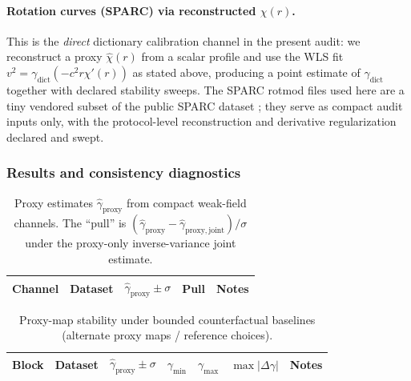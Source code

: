 \paragraph{Rotation curves (SPARC) via reconstructed \texorpdfstring{$\chi(r)$}{chi(r)}.}
\InterfaceTag This is the \emph{direct} dictionary calibration channel in the present audit: we reconstruct a proxy $\widehat\chi(r)$ from a scalar profile and use the WLS
fit $v^2=\gamma_{\mathrm{dict}}(-c^2 r\chi'(r))$ as stated above, producing a point estimate of $\gamma_{\mathrm{dict}}$ together with declared stability sweeps.
\MatchTag The SPARC rotmod files used here are a tiny vendored subset of the public SPARC dataset \cite{LelliMcGaughSchombert2016SPARC}; they serve as compact
audit inputs only, with the protocol-level reconstruction and derivative regularization declared and swept.

\subsubsection{Results and consistency diagnostics}
\label{subsec:gamma_crossobs_results}

\begin{table}[t]
\centering
\caption{Proxy estimates $\widehat\gamma_{\mathrm{proxy}}$ from compact weak-field channels. The ``pull'' is $(\widehat\gamma_{\mathrm{proxy}}-\widehat\gamma_{\mathrm{proxy,joint}})/\sigma$ under the proxy-only inverse-variance joint estimate.}
\label{tab:gamma_proxy_estimates}
\begin{tabular}{llllp{7.2cm}}
\toprule
Channel & Dataset & $\widehat\gamma_{\mathrm{proxy}} \pm \sigma$ & Pull & Notes \\
\midrule
%
\end{tabular}
\end{table}

\begin{table}[t]
\centering
\caption{Proxy-map stability under bounded counterfactual baselines (alternate proxy maps / reference choices).}
\label{tab:gamma_proxy_stability}
\begin{tabular}{llllllp{7.2cm}}
\toprule
Block & Dataset & $\widehat\gamma_{\mathrm{proxy}} \pm \sigma$ & $\gamma_{\min}$ & $\gamma_{\max}$ & $\max|\Delta\gamma|$ & Notes \\
\midrule
%
\end{tabular}
\end{table}

